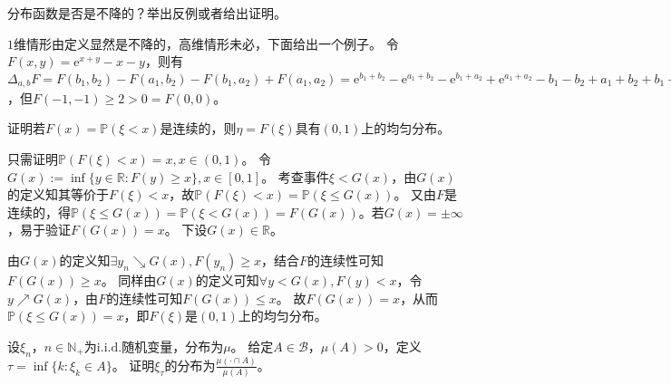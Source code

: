 \documentclass{ctexart}
\newif\ifpreface
\begin{document}
\large
\setlength{\baselineskip}{1.2em}
\ifpreface

\else
\maketitle
\fi
{}
\begin{problem}\label{pro:5}
  分布函数是否是不降的？举出反例或者给出证明。
\end{problem}
\begin{solution}
  \(1 \)维情形由定义显然是不降的，高维情形未必，下面给出一个例子。
  令\(F(x,y)=\mathrm{e}^{x+y}-x-y \)，则有\(\Delta_{a,b} F = F(b_1,b_2)-F(a_1,b_2)-F(b_1,a_2)+F(a_1,a_2)
    = \mathrm{e}^{b_1+b_2}-\mathrm{e}^{a_1+b_2}-\mathrm{e}^{b_1+a_2}+\mathrm{e}^{a_1+a_2}-b_1-b_2+a_1+b_2+b_1+a_2-a_1-a_2
    = (\mathrm{e}^{b_1}-\mathrm{e}^{a_1})(\mathrm{e}^{b_2}-\mathrm{e}^{a_2}) \geq 0
  \)，但\(F(-1,-1)\geq 2 > 0 = F(0,0) \)。
\end{solution}

\begin{problem}\label{pro:7}
  证明若\(F(x)=\mathbb{P}(\xi < x) \)是连续的，则\(\eta = F(\xi) \)具有\((0,1) \)上的均匀分布。
\end{problem}

\begin{solution}
  只需证明\(\mathbb{P}(F(\xi)< x)=x,x \in (0,1) \)。
  令\(G(x):=\inf\{y \in \mathbb{R}:F(y)\geq x\},x \in [0,1] \)。
  考查事件\(\xi < G(x) \)，由\(G(x) \)的定义知其等价于\(F(\xi)<x \)，故\(\mathbb{P}(F(\xi)<x)=\mathbb{P}(\xi \leq G(x)) \)。
  又由\(F \)是连续的，得\(\mathbb{P}(\xi \leq G(x))=\mathbb{P}(\xi < G(x))=F(G(x)) \)。若\(G(x)=\pm \infty \)，易于验证\(F(G(x))=x \)。
  下设\(G(x)\in \mathbb{R} \)。

  由\(G(x) \)的定义知\(\exists y_n \searrow G(x), F(y_n) \geq x \)，结合\(F \)的连续性可知\(F(G(x)) \geq x\)。
  同样由\(G(x) \)的定义可知\(\forall y < G(x),F(y)<x \)，令\(y \nearrow G(x) \)，由\(F \)的连续性可知\(F(G(x)) \leq x \)。
  故\(F(G(x))=x \)，从而\(\mathbb{P}(\xi \leq G(x))=x \)，即\(F(\xi) \)是\((0,1) \)上的均匀分布。
\end{solution}

\begin{problem}\label{pro:9}
  设\(\xi_n，n \in \mathbb{N}_{+} \)为\(\mathrm{i.i.d.}  \)随机变量，分布为\(\mu \)。
  给定\(A \in \mathcal{B} \)，\(\mu(A) >0 \)，定义\(\tau = \inf\{k:\xi_k \in A\} \)。
  证明\(\xi_{\tau} \)的分布为\(\frac{\mu(\cdot \cap A)}{\mu(A)} \)。
\end{problem}
\end{document}
